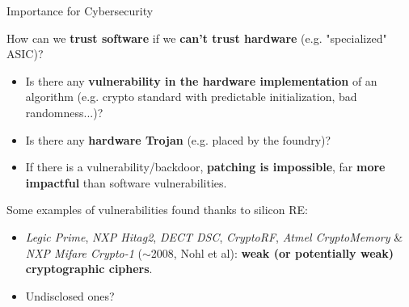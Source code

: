\documentclass[aspectratio=169]{beamer}
\begin{document}
	\begin{frame}{Importance for Cybersecurity}
		
		How can we \textbf{trust software} if we \textbf{can't trust hardware} (e.g. "specialized" ASIC)?
		
		\vspace{3mm}
		
		\begin{itemize}
			\item Is there any \textbf{vulnerability in the hardware implementation} of an algorithm (e.g. crypto standard with predictable initialization, bad randomness...)?
			\item Is there any \textbf{hardware Trojan} (e.g. placed by the foundry)?
			\item If there is a vulnerability/backdoor, \textbf{patching is impossible}, far \textbf{more impactful} than software vulnerabilities.
		\end{itemize}
		
		\vspace{3mm}
		
		Some examples of vulnerabilities found thanks to silicon RE:
		\begin{itemize}
			\item \textit{Legic Prime}, \textit{NXP Hitag2}, \textit{DECT DSC}, \textit{CryptoRF}, \textit{Atmel CryptoMemory} \& \textit{NXP Mifare Crypto-1} ($\sim$2008, Nohl et al): \textbf{weak (or potentially weak) cryptographic ciphers}.
			\item Undisclosed ones?
		\end{itemize}
	\end{frame}
	
\end{document}
